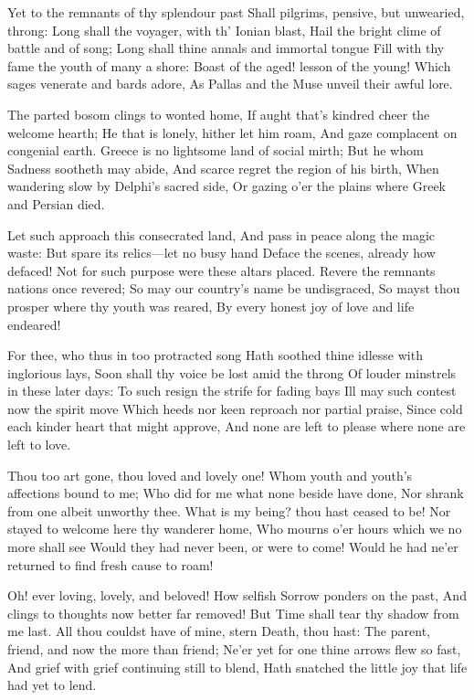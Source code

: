 \documentclass[10pt,twocolumn]{book}
\begin{document}
   Yet to the remnants of thy splendour past
   Shall pilgrims, pensive, but unwearied, throng:
   Long shall the voyager, with th' Ionian blast,
   Hail the bright clime of battle and of song;
   Long shall thine annals and immortal tongue
   Fill with thy fame the youth of many a shore:
   Boast of the aged! lesson of the young!
   Which sages venerate and bards adore,
As Pallas and the Muse unveil their awful lore.


   The parted bosom clings to wonted home,
   If aught that's kindred cheer the welcome hearth;
   He that is lonely, hither let him roam,
   And gaze complacent on congenial earth.
   Greece is no lightsome land of social mirth;
   But he whom Sadness sootheth may abide,
   And scarce regret the region of his birth,
   When wandering slow by Delphi's sacred side,
Or gazing o'er the plains where Greek and Persian died.


   Let such approach this consecrated land,
   And pass in peace along the magic waste:
   But spare its relics---let no busy hand
   Deface the scenes, already how defaced!
   Not for such purpose were these altars placed.
   Revere the remnants nations once revered;
   So may our country's name be undisgraced,
   So mayst thou prosper where thy youth was reared,
By every honest joy of love and life endeared!


   For thee, who thus in too protracted song
   Hath soothed thine idlesse with inglorious lays,
   Soon shall thy voice be lost amid the throng
   Of louder minstrels in these later days:
   To such resign the strife for fading bays\textemdash
   Ill may such contest now the spirit move
   Which heeds nor keen reproach nor partial praise,
   Since cold each kinder heart that might approve,
And none are left to please where none are left to love.


   Thou too art gone, thou loved and lovely one!
   Whom youth and youth's affections bound to me;
   Who did for me what none beside have done,
   Nor shrank from one albeit unworthy thee.
   What is my being? thou hast ceased to be!
   Nor stayed to welcome here thy wanderer home,
   Who mourns o'er hours which we no more shall see\textemdash
   Would they had never been, or were to come!
Would he had ne'er returned to find fresh cause to roam!


   Oh! ever loving, lovely, and beloved!
   How selfish Sorrow ponders on the past,
   And clings to thoughts now better far removed!
   But Time shall tear thy shadow from me last.
   All thou couldst have of mine, stern Death, thou hast:
   The parent, friend, and now the more than friend;
   Ne'er yet for one thine arrows flew so fast,
   And grief with grief continuing still to blend,
Hath snatched the little joy that life had yet to lend.
\end{document}
